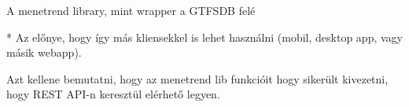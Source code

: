 

A menetrend library, mint wrapper a GTFSDB felé

* Az előnye, hogy így más kliensekkel is lehet használni (mobil, desktop app, vagy másik webapp).


Azt kellene bemutatni, hogy az menetrend lib funkcióit hogy sikerült kivezetni, hogy REST API-n keresztül elérhető legyen.
